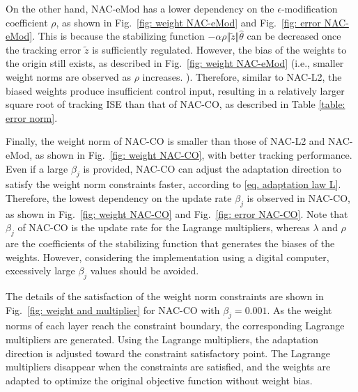 \documentclass[letterpaper, 10 pt, conference]{ieeeconf}  %
\begin{document}
On the other hand, NAC-eMod has a lower dependency on the $\epsilon$-modification coefficient $\rho$, as shown in Fig.~\ref{fig: weight NAC-eMod} and Fig.~\ref{fig: error NAC-eMod}.
This is because the stabilizing function $-\alpha\rho\Vert\tilde z\Vert\hat\theta$ can be decreased once the tracking error $\tilde z$ is sufficiently regulated.
However, the bias of the weights to the origin still exists, as described in Fig.~\ref{fig: weight NAC-eMod} (i.e., smaller weight norms are observed as $\rho$ increases. ).
Therefore, similar to NAC-L2, the biased weights produce insufficient control input, resulting in a relatively larger square root of tracking ISE than that of NAC-CO, as described in Table \ref{table: error norm}.

Finally, the weight norm of NAC-CO is smaller than those of NAC-L2 and NAC-eMod, as shown in Fig.~\ref{fig: weight NAC-CO}, with better tracking performance.
Even if a large $\beta_j$ is provided, NAC-CO can adjust the adaptation direction to satisfy the weight norm constraints faster, according to \eqref{eq. adaptation law L}.
Therefore, the lowest dependency on the update rate $\beta_j$ is observed in NAC-CO, as shown in Fig.~\ref{fig: weight NAC-CO} and Fig.~\ref{fig: error NAC-CO}.
Note that $\beta_j$ of NAC-CO is the update rate for the Lagrange multipliers, whereas $\lambda$ and $\rho$ are the coefficients of the stabilizing function that generates the biases of the weights.
However, considering the implementation using a digital computer, excessively large $\beta_j$ values should be avoided.

The details of the satisfaction of the weight norm constraints are shown in Fig.~\ref{fig: weight and multiplier} for NAC-CO with $\beta_j=0.001$.
As the weight norms of each layer reach the constraint boundary, the corresponding Lagrange multipliers are generated.
Using the Lagrange multipliers, the adaptation direction is adjusted toward the constraint satisfactory point.
The Lagrange multipliers disappear when the constraints are satisfied, and the weights are adapted to optimize the original objective function without weight bias.
\end{document}
